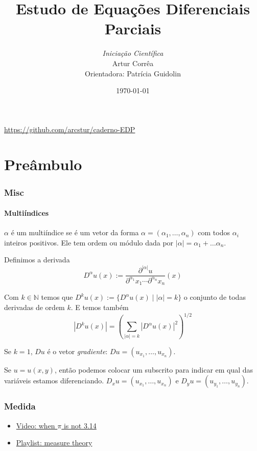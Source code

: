\documentclass[11pt]{article}
\title{Estudo de Equações Diferenciais Parciais}
\author{\textit{Iniciação Científica}\\   Artur Corrêa \\ Orientadora: Patrícia Guidolin}
\date{\today}
\newcommand{\N}{\mathbb{N}}
\newcommand{\p}{\partial}
\begin{document}
\maketitle

\begin{center}
	\url{https://github.com/arcstur/caderno-EDP}
\end{center}

\tableofcontents

\pagebreak
\part{Preâmbulo}
\section{Misc}
\subsection{Multiíndices}

\( \alpha \) é um multiíndice se é um vetor da forma \( \alpha = (\alpha_1, \ldots, \alpha_n) \) com todos \( \alpha_i \) inteiros positivos. Ele tem ordem ou módulo dada por \( |\alpha| = \alpha_1 + \ldots \alpha_n \).

Definimos a derivada \[ D^\alpha u(x) := \frac{\p^{|\alpha|}u}{\p^{\alpha_1}x_1 \cdots \p^{\alpha_n}x_n}(x) \]

Com \( k \in \N \) temos que \( D^ku(x):=\{ D^{\alpha}u(x) \mid  |\alpha| =k\} \) o conjunto de todas derivadas de ordem \( k \). E temos também \[ | D^k u(x) | = \left( \sum_{|\alpha|=k}|D^{\alpha}u(x)|^2\right)^{1/2} \]

Se \( k=1 \), \( Du \) é o vetor \textit{gradiente}: \( Du=(u_{x_1}, \ldots, u_{x_n}) \).

Se \( u=u(x,y) \), então podemos colocar um subscrito para indicar em qual das variáveis estamos diferenciando. \( D_xu = (u_{x_1}, \ldots, u_{x_n}) \) e \( D_yu=(u_{y_1}, \ldots, u_{y_n}) \).

\section{Medida}

\begin{itemize}
	\item \href{https://www.youtube.com/watch?v=ineO1tIyPfM}{Video: when \( \pi \) is not 3.14}
	\item \href{https://www.youtube.com/playlist?list=PLBh2i93oe2qvMVqAzsX1Kuv6-4fjazZ8j}{Playlist: measure theory}
\end{itemize}
\end{document}
